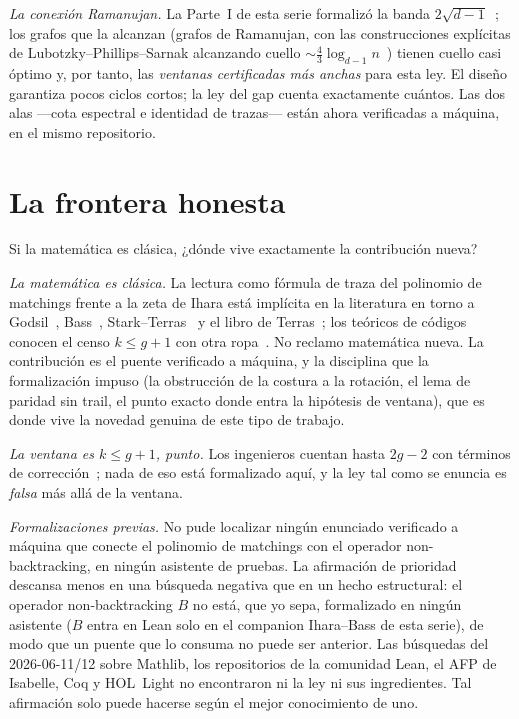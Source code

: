 \documentclass[11pt]{article}
\begin{document}
\emph{La conexión Ramanujan.} La Parte~I de esta serie formalizó la banda
$2\sqrt{d-1}$~\cite{MarinGG2026}; los grafos que la alcanzan (grafos de Ramanujan, con las
construcciones explícitas de Lubotzky--Phillips--Sarnak alcanzando cuello
$\sim \tfrac43 \log_{d-1} n$~\cite{LPS1988}) tienen cuello casi óptimo y, por tanto, las
\emph{ventanas certificadas más anchas} para esta ley.
El diseño garantiza pocos ciclos cortos; la ley del gap cuenta exactamente cuántos. Las dos
alas ---cota espectral e identidad de trazas--- están ahora verificadas a máquina, en el
mismo repositorio.

\section{La frontera honesta}
\label{sec:boundary}

Si la matemática es clásica, ¿dónde vive exactamente la contribución nueva?

\emph{La matemática es clásica.} La lectura como fórmula de traza del polinomio de matchings
frente a la zeta de Ihara está implícita en la literatura en torno a
Godsil~\cite{Godsil1981,GodsilBook}, Bass~\cite{Bass1992},
Stark--Terras~\cite{StarkTerras1996} y el libro de Terras~\cite{Terras2011}; los teóricos de
códigos conocen el censo $k \le g+1$ con otra ropa~\cite{BlakeLin2018}. No reclamo
matemática nueva. La contribución es el puente verificado a máquina, y la disciplina que la
formalización impuso (la obstrucción de la costura a la rotación, el lema de paridad sin
trail, el punto exacto donde entra la hipótesis de ventana), que es donde vive la novedad
genuina de este tipo de trabajo.

\emph{La ventana es $k \le g+1$, punto.} Los ingenieros cuentan hasta $2g-2$ con términos de
corrección~\cite{BlakeLin2018,Dehghan2018}; nada de eso está formalizado aquí, y la ley tal
como se enuncia es \emph{falsa} más allá de la ventana.

\emph{Formalizaciones previas.} No pude localizar ningún enunciado verificado a máquina que
conecte el polinomio de matchings con el operador non-backtracking, en ningún asistente de
pruebas. La afirmación de prioridad descansa menos en una búsqueda negativa que en un hecho
estructural: el operador non-backtracking $B$ no está, que yo sepa, formalizado en ningún
asistente ($B$ entra en Lean solo en el companion Ihara--Bass de esta serie), de modo que un
puente que lo consuma no puede ser anterior. Las búsquedas del 2026-06-11/12 sobre Mathlib, los
repositorios de la comunidad Lean, el AFP de Isabelle, Coq y HOL~Light no encontraron ni la
ley ni sus ingredientes. Tal afirmación solo puede hacerse según el mejor conocimiento de
uno.
\end{document}
